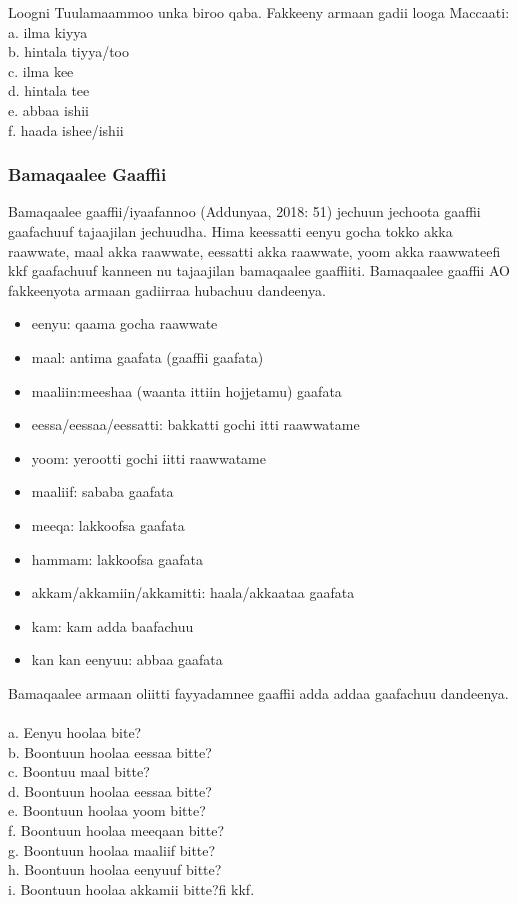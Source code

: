 \documentclass[11pt,b5paper]{book}
\begin{document}
Loogni Tuulamaammoo unka biroo qaba. Fakkeeny armaan gadii looga Maccaati\cite{griefenow2001grammatical}:\\
a. ilma kiyya\\
b. hintala tiyya/too\\
c. ilma kee\\
d. hintala tee\\
e. abbaa ishii\\
f. haada ishee/ishii\\

\subsubsection{Bamaqaalee Gaaffii}

Bamaqaalee gaaffii/iyaafannoo (Addunyaa, 2018: 51) jechuun jechoota gaaffii gaafachuuf tajaajilan jechuudha. Hima
keessatti eenyu gocha tokko akka raawwate, maal akka raawwate, eessatti akka raawwate, yoom akka raawwateefi kkf
gaafachuuf kanneen nu tajaajilan bamaqaalee gaaffiiti. Bamaqaalee gaaffii AO fakkeenyota armaan gadiirraa hubachuu
dandeenya. \\
\begin{itemize}
	\item eenyu: qaama gocha raawwate
	\item maal: antima gaafata (gaaffii gaafata)
	\item maaliin:meeshaa (waanta ittiin hojjetamu) gaafata
	\item eessa/eessaa/eessatti:  bakkatti gochi itti raawwatame
	\item yoom: yerootti gochi iitti raawwatame
	\item maaliif: sababa gaafata
	\item meeqa: lakkoofsa gaafata
	\item hammam: lakkoofsa gaafata
	\item akkam/akkamiin/akkamitti: haala/akkaataa gaafata
	\item kam: kam adda baafachuu
	\item kan kan eenyuu:  abbaa gaafata
\end{itemize}
Bamaqaalee armaan oliitti fayyadamnee gaaffii adda addaa gaafachuu dandeenya. \\
\\
a. Eenyu hoolaa bite?\\
b. Boontuun hoolaa eessaa bitte?\\
c. Boontuu maal bitte?\\
d. Boontuun hoolaa eessaa bitte?\\
e. Boontuun hoolaa yoom bitte?\\
f. Boontuun hoolaa meeqaan bitte?\\
g. Boontuun hoolaa maaliif bitte?\\
h. Boontuun hoolaa eenyuuf bitte?\\
i. Boontuun hoolaa akkamii bitte?fi kkf.
\end{document}
